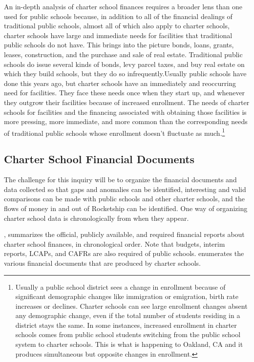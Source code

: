 An in-depth analysis of charter school finances requires a broader lens than one used for public schools because, in addition to all of the financial dealings of traditional public schools, almost all of which also apply to charter schools, charter schools have large and immediate needs for facilities that traditional public schools do not have. This brings into the picture bonds, loans, grants, leases, construction, and the purchase and sale of real estate. Traditional public schools do issue several kinds of bonds, levy parcel taxes, and buy real estate on which they build schools, but they do so infrequently.Usually public schools have done this years ago, but charter schools have an immediately and reoccurring need for facilities. They face these needs once when they start up, and whenever they outgrow their facilities because of increased enrollment. The needs of charter schools for facilities and the financing associated with obtaining those facilities is more pressing, more immediate, and more common than the corresponding needs of traditional public schools whose enrollment doesn't fluctuate as much.\footnote{Usually a public school district sees a change in enrollment because of significant demographic changes like immigration or emigration, birth rate increases or declines. Charter schools can see large enrollment changes absent any demographic change, even if the total number of students residing in a district stays the same. In some instances, increased enrollment in charter schools comes from public school students switching from the public school system to charter schools. This is what is happening to Oakland, CA and it produces simultaneous but opposite changes in enrollment.}

\subsection{Charter School Financial Documents}\label{sec:charter-financial-docs}\indent

The challenge for this inquiry will be to organize the financial documents and data collected so that gaps and anomalies can be identified, interesting and valid comparisons can be made with public schools and other charter schools, and the flows of money in and out of Rocketship can be identified. One way of organizing charter school data is chronologically from when they appear.

, summarizes the official, publicly available, and required financial reports about charter school finances, in chronological order. Note that budgets, interim reports, LCAPs, and CAFRs are also required of public schools.  enumerates the various financial documents that are produced by charter schools. 

